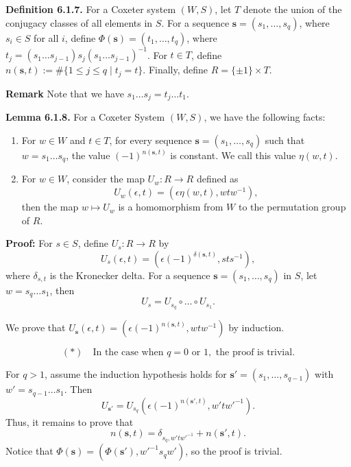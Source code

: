 \documentclass[../main.tex]{subfiles}
\begin{document}
\vspace{\baselineskip}
\noindent \textbf{Definition 6.1.7.} For a Coxeter system \( (W, S) \), let \( T \) denote the union of the conjugacy classes of all elements in \( S \). For a sequence \( \mathbf{s} = (s_1, \dots, s_q) \), where \( s_i \in S \) for all \( i \), define \( \Phi(\mathbf{s}) = (t_1, \dots, t_q) \), where \( t_j = (s_1 \dots s_{j-1}) s_j (s_1 \dots s_{j-1})^{-1} \). For \( t \in T \), define \( n(\mathbf{s}, t) := \# \{ 1 \le j \le q \mid t_j = t \} \). Finally, define \( R = \{\pm 1\} \times T \).

\noindent \textbf{Remark} Note that we have \( s_1 \dots s_j = t_j \dots t_1 \).

\vspace{\baselineskip}

\noindent \textbf{Lemma 6.1.8.} For a Coxeter System $(W, S)$, we have the following facts:

\begin{enumerate}
    \item For $w \in W$ and $t \in T$, for every sequence $\mathbf{s} = (s_1, \dots, s_q)$ such that $w = s_1 \dots s_q$, the value $(-1)^{n(\mathbf{s}, t)}$ is constant. We call this value $\eta(w, t)$.
    \item For $w \in W$, consider the map $U_w : R \rightarrow R$ defined as
    \[
    U_w(\epsilon, t) = (\epsilon \eta(w, t), w t w^{-1}),
    \]
    then the map $w \mapsto U_w$ is a homomorphism from $W$ to the permutation group of $R$.
\end{enumerate}

\vspace{0.5\baselineskip}

\noindent \textbf{Proof:} For $s \in S$, define $U_s : R \rightarrow R$ by
\[
U_s(\epsilon, t) = (\epsilon (-1)^{\delta(\mathbf{s}, t)}, s t s^{-1}),
\]
where $\delta_{s,t}$ is the Kronecker delta. For a sequence $\mathbf{s} = (s_1, \dots, s_q)$ in $S$, let $w = s_q \dots s_1$, then
\[
U_s = U_{s_q} \circ \dots \circ U_{s_1}.
\]

We prove that $U_{\mathbf{s}}(\epsilon, t) = (\epsilon (-1)^{n(\mathbf{s}, t)}, w t w^{-1})$ by induction. 

\[
(*) \quad \text{In the case when } q = 0 \text{ or } 1, \text{ the proof is trivial.}
\]

For $q > 1$, assume the induction hypothesis holds for $\mathbf{s'} = (s_1, \dots, s_{q-1})$ with $w' = s_{q-1} \dots s_1$. Then
\[
U_{\mathbf{s'}} = U_{s_q} (\epsilon (-1)^{n(\mathbf{s'}, t)}, w' t w'^{-1}).
\]
Thus, it remains to prove that
\[
n(\mathbf{s}, t) = \delta_{s_q, w' t w'^{-1}} + n(\mathbf{s'}, t).
\]
Notice that $\Phi(\mathbf{s}) = (\Phi(\mathbf{s'}), w'^{-1} s_q w')$, so the proof is trivial.
\end{document}
